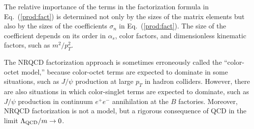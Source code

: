The relative importance of the terms in the factorization formula in
Eq.~(\ref{prod:fact}) is determined not only by the sizes of the
matrix elements but also by the sizes of the coefficients $\sigma_n$
in Eq.~(\ref{prod:fact}).  The size of the coefficient depends on its
order in $\alpha_s$, color factors, and dimensionless kinematic
factors, such as $m^2/p_T^2$.

The NRQCD factorization approach is sometimes erroneously called the
``color-octet model,'' because color-octet terms are expected to
dominate in some situations, such as $J/\psi$ production at large
$p_T$ in hadron colliders.  However, there are also situations in
which color-singlet terms are expected to dominate, such as $J/\psi$
production in continuum $e^+ e^-$ annihilation at the $B$ factories.
Moreover, NRQCD factorization is not a model, but a rigorous
consequence of QCD in the limit $\Lambda_{\rm QCD}/m\rightarrow 0$.

